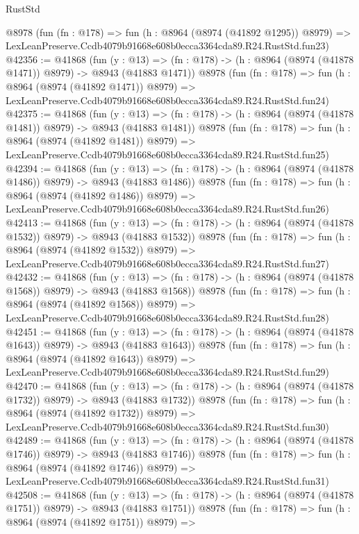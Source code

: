 \begin{lexlean}{RustStd}
\begin{coremodule}
    @8978
    (fun (fn : @178) =>
    fun (h : @8964 (@8974 (@41892 @1295)) @8979) =>
    LexLeanPreserve.Ccdb4079b91668e608b0ecca3364cda89.R24.RustStd.fun23)
@42356 := @41868
    (fun (y : @13) =>
    (fn : @178) -> (h : @8964 (@8974 (@41878 @1471)) @8979) -> @8943 (@41883 @1471))
    @8978
    (fun (fn : @178) =>
    fun (h : @8964 (@8974 (@41892 @1471)) @8979) =>
    LexLeanPreserve.Ccdb4079b91668e608b0ecca3364cda89.R24.RustStd.fun24)
@42375 := @41868
    (fun (y : @13) =>
    (fn : @178) -> (h : @8964 (@8974 (@41878 @1481)) @8979) -> @8943 (@41883 @1481))
    @8978
    (fun (fn : @178) =>
    fun (h : @8964 (@8974 (@41892 @1481)) @8979) =>
    LexLeanPreserve.Ccdb4079b91668e608b0ecca3364cda89.R24.RustStd.fun25)
@42394 := @41868
    (fun (y : @13) =>
    (fn : @178) -> (h : @8964 (@8974 (@41878 @1486)) @8979) -> @8943 (@41883 @1486))
    @8978
    (fun (fn : @178) =>
    fun (h : @8964 (@8974 (@41892 @1486)) @8979) =>
    LexLeanPreserve.Ccdb4079b91668e608b0ecca3364cda89.R24.RustStd.fun26)
@42413 := @41868
    (fun (y : @13) =>
    (fn : @178) -> (h : @8964 (@8974 (@41878 @1532)) @8979) -> @8943 (@41883 @1532))
    @8978
    (fun (fn : @178) =>
    fun (h : @8964 (@8974 (@41892 @1532)) @8979) =>
    LexLeanPreserve.Ccdb4079b91668e608b0ecca3364cda89.R24.RustStd.fun27)
@42432 := @41868
    (fun (y : @13) =>
    (fn : @178) -> (h : @8964 (@8974 (@41878 @1568)) @8979) -> @8943 (@41883 @1568))
    @8978
    (fun (fn : @178) =>
    fun (h : @8964 (@8974 (@41892 @1568)) @8979) =>
    LexLeanPreserve.Ccdb4079b91668e608b0ecca3364cda89.R24.RustStd.fun28)
@42451 := @41868
    (fun (y : @13) =>
    (fn : @178) -> (h : @8964 (@8974 (@41878 @1643)) @8979) -> @8943 (@41883 @1643))
    @8978
    (fun (fn : @178) =>
    fun (h : @8964 (@8974 (@41892 @1643)) @8979) =>
    LexLeanPreserve.Ccdb4079b91668e608b0ecca3364cda89.R24.RustStd.fun29)
@42470 := @41868
    (fun (y : @13) =>
    (fn : @178) -> (h : @8964 (@8974 (@41878 @1732)) @8979) -> @8943 (@41883 @1732))
    @8978
    (fun (fn : @178) =>
    fun (h : @8964 (@8974 (@41892 @1732)) @8979) =>
    LexLeanPreserve.Ccdb4079b91668e608b0ecca3364cda89.R24.RustStd.fun30)
@42489 := @41868
    (fun (y : @13) =>
    (fn : @178) -> (h : @8964 (@8974 (@41878 @1746)) @8979) -> @8943 (@41883 @1746))
    @8978
    (fun (fn : @178) =>
    fun (h : @8964 (@8974 (@41892 @1746)) @8979) =>
    LexLeanPreserve.Ccdb4079b91668e608b0ecca3364cda89.R24.RustStd.fun31)
@42508 := @41868
    (fun (y : @13) =>
    (fn : @178) -> (h : @8964 (@8974 (@41878 @1751)) @8979) -> @8943 (@41883 @1751))
    @8978
    (fun (fn : @178) =>
    fun (h : @8964 (@8974 (@41892 @1751)) @8979) =>

\end{coremodule}
\end{lexlean}
